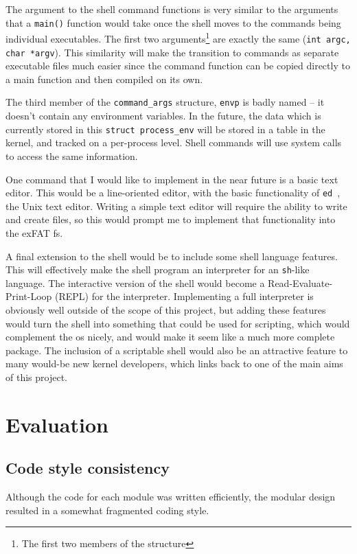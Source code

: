 \documentclass{article}
\begin{document}
The argument to the shell command functions is very similar to the arguments
that a \texttt{main()} function would take once the shell moves to the commands
being individual executables. The first two arguments\footnote{The first two
members of the structure} are exactly the same (\verb!int argc, char *argv!).
This similarity will make the transition to commands as separate executable
files much easier since the command function can be copied directly to a main
function and then compiled on its own.

The third member of the \verb!command_args! structure, \verb!envp! is badly
named -- it doesn't contain any environment variables. In the future, the data
which is currently stored in this \verb!struct process_env! will be stored in a
table in the kernel, and tracked on a per-process level. Shell commands will
use system calls to access the same information.

One command that I would like to implement in the near future is a basic text
editor. This would be a line-oriented editor, with the basic functionality of
\texttt{ed}~\cite{ed}, the Unix text editor. Writing a simple text editor will
require the ability to write and create files, so this would prompt me to
implement that functionality into the exFAT \gls{fs}.

A final extension to the shell would be to include some shell language
features. This will effectively make the shell program an interpreter for an
\texttt{sh}-like language. The interactive version of the shell would become a
Read-Evaluate-Print-Loop (REPL) for the interpreter. Implementing a full
interpreter is obviously well outside of the scope of this project, but adding
these features would turn the shell into something that could be used for
scripting, which would complement the \gls{os} nicely, and would make it seem
like a much more complete package. The inclusion of a scriptable shell would
also be an attractive feature to many would-be new kernel developers, which
links back to one of the main aims of this project.

\section{Evaluation}
\subsection{Code style consistency}
Although the code for each module was written efficiently, the modular design
resulted in a somewhat fragmented coding style.
\end{document}
